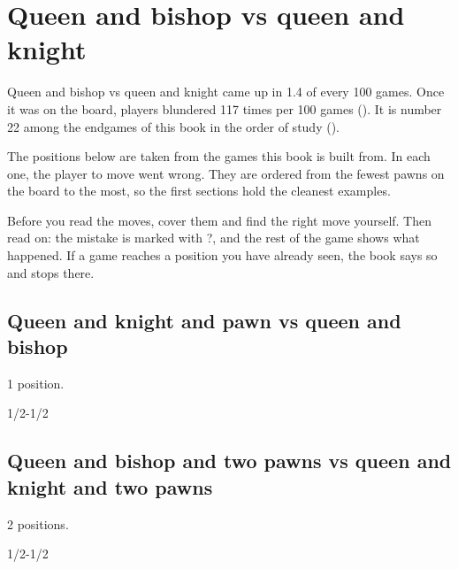 \chapter{Queen and bishop vs queen and knight}\label{ch:queen-and-bishop-vs-queen-and-knight}
Queen and bishop vs queen and knight came up in 1.4 of every 100 games. Once it was on the board, players blundered 117 times per 100 games (). It is number 22 among the endgames of this book in the order of study ().

The positions below are taken from the games this book is built from. In each one, the player to move went wrong. They are ordered from the fewest pawns on the board to the most, so the first sections hold the cleanest examples.

Before you read the moves, cover them and find the right move yourself. Then read on: the mistake is marked with ?, and the rest of the game shows what happened. If a game reaches a position you have already seen, the book says so and stops there.


\section{Queen and knight and pawn vs queen and bishop}
1 position.


1/2-1/2\par
\section{Queen and bishop and two pawns vs queen and knight and two pawns}
2 positions.


1/2-1/2\par
{}

